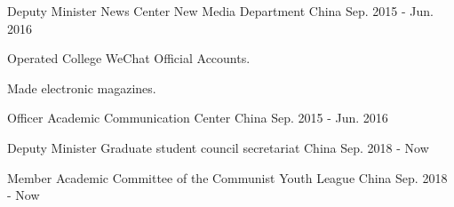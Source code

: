


\begin{cventries}


\cventry
{Deputy Minister} %
{News Center New Media Department} %
{China} %
{Sep. 2015 - Jun. 2016} %
{ %
\begin{cvitems}
\item {Operated College WeChat Official Accounts.}
\item {Made electronic magazines.}
\end{cvitems}
}


\cventry
{Officer} %
{Academic Communication Center} %
{China} %
{Sep. 2015 - Jun. 2016} %
{ %
}

\cventry
{Deputy Minister} %
{Graduate student council secretariat} %
{China} %
{Sep. 2018 - Now} %
{ %
}

\cventry
{Member} %
{Academic Committee of the Communist Youth League} %
{China} %
{Sep. 2018 - Now} %
{ %
}


\end{cventries}